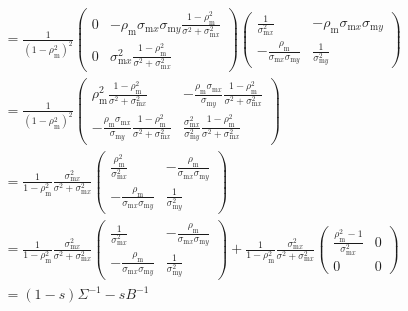 \documentclass{article}
\newcommand{\x}[1]{\text{#1}}
\begin{document}
\begin{landscape}
\begin{align*}
\\&=\frac{1}{(1-\rho_\x{m}^2)^2}\left(\begin{array}{cc}0 & -\rho_\x{m}\sigma_{\x{m}x}\sigma_{\x{m}y}\frac{1-\rho_\x{m}^2}{\sigma^2+\sigma_{\x{m}x}^2}\\ 0 & \sigma_{\x{m}x}^2\frac{1-\rho_\x{m}^2}{\sigma^2+\sigma_{\x{m}x}^2} \end{array}\right)\left(\begin{array}{cc}\frac{1}{\sigma_{\x{m}x}^2} & -\rho_\x{m}\sigma_{\x{m}x}\sigma_{\x{m}y} \\ -\frac{\rho_\x{m}}{\sigma_{\x{m}x}\sigma_{\x{m}y}} & \frac{1}{\sigma_{\x{m}y}^2} \end{array}\right)
\\&=\frac{1}{(1-\rho_\x{m}^2)^2}\left(\begin{array}{cc}\rho_\x{m}^2\frac{1-\rho_\x{m}^2}{\sigma^2+\sigma_{\x{m}x}^2} & -\frac{\rho_\x{m}\sigma_{\x{m}x}}{\sigma_{\x{m}y}}\frac{1-\rho_\x{m}^2}{\sigma^2+\sigma_{\x{m}x}^2} \\-\frac{\rho_\x{m}\sigma_{\x{m}x}}{\sigma_{\x{m}y}}\frac{1-\rho_\x{m}^2}{\sigma^2+\sigma_{\x{m}x}^2}& \frac{\sigma_{\x{m}x}^2}{\sigma_{\x{m}y}^2}\frac{1-\rho_\x{m}^2}{\sigma^2+\sigma_{\x{m}x}^2}  \end{array}\right)
\\ &=\frac{1}{1-\rho_\x{m}^2}\frac{\sigma_{\x{m}x}^2}{\sigma^2+\sigma_{\x{m}x}^2}\left(\begin{array}{cc}\frac{\rho_\x{m}^2}{\sigma_{\x{m}x}^2} & -\frac{\rho_\x{m}}{\sigma_{\x{m}x}\sigma_{\x{m}y}} \\ -\frac{\rho_\x{m}}{\sigma_{\x{m}x}\sigma_{\x{m}y}} & \frac{1}{\sigma_{\x{m}y}^2} \end{array}\right)
\\&=\frac{1}{1-\rho_\x{m}^2}\frac{\sigma_{\x{m}x}^2}{\sigma^2+\sigma_{\x{m}x}^2}\left(\begin{array}{cc}\frac{1}{\sigma_{\x{m}x}^2} & -\frac{\rho_\x{m}}{\sigma_{\x{m}x}\sigma_{\x{m}y}} \\ -\frac{\rho_\x{m}}{\sigma_{\x{m}x}\sigma_{\x{m}y}} & \frac{1}{\sigma_{\x{m}y}^2} \end{array}\right)+\frac{1}{1-\rho_\x{m}^2}\frac{\sigma_{\x{m}x}^2}{\sigma^2+\sigma_{\x{m}x}^2}\left(\begin{array}{cc}\frac{\rho_\x{m}^2-1}{\sigma_{\x{m}x}^2} & 0 \\ 0 & 0 \end{array}\right)
\\ & = (1-s)\Sigma^{-1}-sB^{-1}

\end{align*}
\end{landscape}
\end{document}

